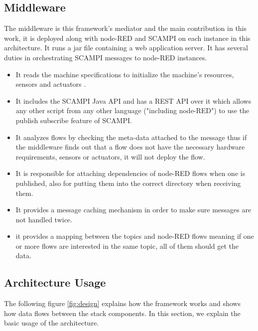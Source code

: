 \subsection{Middleware}
The middleware is this framework's mediator and the main contribution in this work, it is deployed along with node-RED and SCAMPI on each instance in this architecture. It runs a jar file containing a web application server. It has several duties in orchestrating  SCAMPI messages to node-RED instances.
\begin{itemize}
\item It reads the machine specifications to initialize the machine's resources, sensors and actuators 	.
\item It includes the SCAMPI Java API and has a REST API over it which allows any other script from any other language ("including node-RED") to use the publish subscribe feature of SCAMPI.
\item It analyzes  flows by checking the meta-data  attached to the message thus if the middleware finds out that a flow does not have the necessary hardware requirements, sensors or actuators, it will not deploy the flow. 
\item It is responsible for attaching dependencies of  node-RED flows when one is published, also for putting them into the correct directory when receiving them.
\item It provides a message caching mechanism in order to make sure messages are not handled twice.
\item it provides a mapping between the topics and node-RED flows meaning if one or more flows are interested in the same topic, all of them should get the data.
 \end{itemize}

\subsection{Architecture Usage} \label{subsec:usage}
The following figure \ref{fig:design} explains how the framework works and shows how data flows between the stack components. In this section, we explain the basic usage of the architecture.

